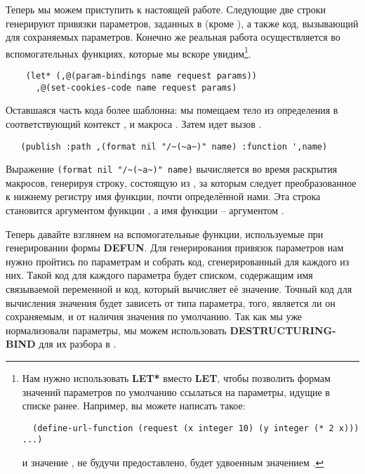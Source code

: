 Теперь мы можем приступить к настоящей работе. Следующие две строки генерируют привязки
параметров, заданных в  (кроме ), а также код,
вызывающий  для сохраняемых параметров. Конечно же реальная работа
осуществляется во вспомогательных функциях, которые мы вскоре увидим\footnote{Нам нужно
  использовать \textbf{LET* } вместо \textbf{LET}, чтобы позволить формам значений
  параметров по умолчанию ссылаться на параметры, идущие в списке ранее. Например, вы
  можете написать такое:

\begin{lstlisting}
  (define-url-function (request (x integer 10) (y integer (* 2 x))) ...)
\end{lstlisting}

и значение , не будучи предоставлено, будет удвоенным значением .}.

\begin{lstlisting}
    (let* (,@(param-bindings name request params))
      ,@(set-cookies-code name request params)
\end{lstlisting}

Оставшаяся часть кода более шаблонна: мы помещаем тело из определения
 в соответствующий контекст ,
 и макроса . Затем идет вызов .

\begin{lstlisting}
   (publish :path ,(format nil "/~(~a~)" name) :function ',name)
\end{lstlisting}

Выражение \lstinline!(format nil "/~(~a~)" name)! вычисляется во время раскрытия макросов,
генерируя строку, состоящую из \code{/}, за которым следует преобразованное к нижнему
регистру имя функции, почти определённой нами. Эта строка становится аргументом
 функции , а имя функции -- аргументом .

Теперь давайте взглянем на вспомогательные функции, используемые при генерировании формы
\textbf{DEFUN}. Для генерирования привязок параметров нам нужно пройтись по параметрам и
собрать код, сгенерированный  для каждого из них. Такой код для
каждого параметра будет списком, содержащим имя связываемой переменной и код, который
вычисляет её значение. Точный код для вычисления значения будет зависеть от типа
параметра, того, является ли он сохраняемым, и от наличия значения по умолчанию. Так как
мы уже нормализовали параметры, мы можем использовать \textbf{DESTRUCTURING-BIND} для их
разбора в .

